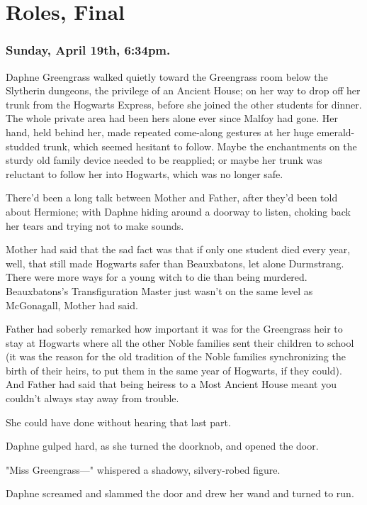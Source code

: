 \chapter{Roles, Final}

\subsection{Sunday, April 19th, 6:34pm.}

Daphne Greengrass walked quietly toward the Greengrass room below the Slytherin 
dungeons, the privilege of an Ancient House; on her way to drop off her trunk 
from the Hogwarts Express, before she joined the other students for dinner. The 
whole private area had been hers alone ever since Malfoy had gone. Her hand, 
held behind her, made repeated come-along gestures at her huge emerald-studded 
trunk, which seemed hesitant to follow. Maybe the enchantments on the sturdy 
old family device needed to be reapplied; or maybe her trunk was reluctant to 
follow her into Hogwarts, which was no longer safe.

There'd been a long talk between Mother and Father, after they'd been told 
about Hermione; with Daphne hiding around a doorway to listen, choking back her 
tears and trying not to make sounds.

Mother had said that the sad fact was that if only one student died every year, 
well, that still made Hogwarts safer than Beauxbatons, let alone Durmstrang. 
There were more ways for a young witch to die than being murdered. 
Beauxbatons's Transfiguration Master just wasn't on the same level as 
McGonagall, Mother had said.

Father had soberly remarked how important it was for the Greengrass heir to 
stay at Hogwarts where all the other Noble families sent their children to 
school (it was the reason for the old tradition of the Noble families 
synchronizing the birth of their heirs, to put them in the same year of 
Hogwarts, if they could). And Father had said that being heiress to a Most 
Ancient House meant you couldn't always stay away from trouble.

She could have done without hearing that last part.

Daphne gulped hard, as she turned the doorknob, and opened the door.

"Miss Greengrass---" whispered a shadowy, silvery-robed figure.

Daphne screamed and slammed the door and drew her wand and turned to run.

